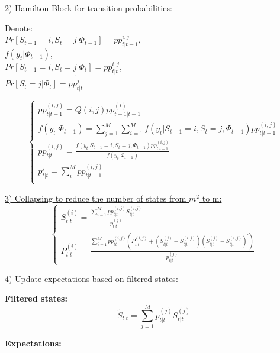 \documentclass[12pt,reqno]{article}
\numberwithin{equation}{section}
\begin{document}
\vspace{10 mm}

\noindent
\underline{2)  Hamilton Block for transition probabilities:}\ \\
\vspace{6 mm}

\noindent
Denote: \\

 $ Pr[S_{t-1}=i,S_t=j | \Phi_{t-1} ] = pp_{t|t-1}^{i,j} $,\\
$f(y_t|\Phi_{t-1}) $, \\
$Pr[S_{t-1}=i,S_t=j|\Phi_t]= pp_{t|t}^{i,j} $, \\
$Pr[S_t=j|\Phi_t]= \tilde{pp_{t|t}^{j}}$ \\
\vspace{5 mm}

$$
\begin{cases}
pp_{t|t-1}^{(i,j)}=Q(i,j) pp_{t-1|t-1}^{(i)} \\
f(y_t|\Phi_{t-1}) = \sum_{j=1}^M \sum_{i=1}^M f(y_t | S_{t-1}=i, S_t=j, \Phi_{t-1} ) pp_{t|t-1}^{(i,j)} \\
pp_{t|t}^{(i,j)} = \frac{f(y_t | S_{t-1} = i, S_t = j, \Phi_{t-1}) pp_{t|t-1}^{(i,j)} } { f(y_t| \Phi_{t-1})} \\
p_{t|t}^{j} = \sum_{i}^M pp_{t|t-1}^{(i,j)}\\
\end{cases}
$$


\noindent
\underline{3) Collapsing to reduce the number of states from $m^2 $ to m:} \\
$$
\begin{cases}
{S}_{t|t}^{(i)} = \frac{\sum_{i=1}^M pp_{t|t}^{(i,j)} S_{t|t}^{(i,j)} } { p_{t|t}^{(j)}} \\
{P}_{t|t}^{(i)}= \frac{\sum_{i=1}^M pp_{tt}^{(i,j)} (P_{t|t}^{(i,j)} + (S_{t|t}^{(j)} - S_{t|t}^{(i,j)})(S_{t|t}^{(j)} - S_{t|t}^{(i,j)})^{\prime})}{p_{t|t}^{(j)}}
\end{cases}
$$
\vspace{1 mm}

\noindent
\underline{4) Update expectations based on filtered states:} \\
\vspace{5 mm}

\textbf{Filtered states:} \\

$$
\tilde{S}_{t|t} = \sum_{j=1}^M p_{t|t}^{(j)} S_{t|t}^{(j)}
$$

\textbf{Expectations: } \\
\end{document}
